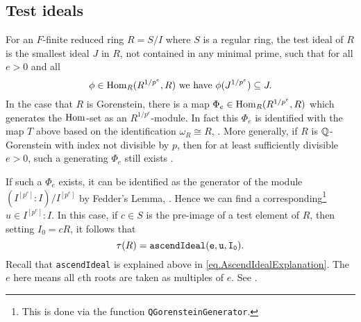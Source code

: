 \documentclass[11pt]{amsart}
\begin{document}
\subsection{Test ideals}

For an $F$-finite reduced ring $R = S/I$ where $S$ is a regular ring, the test ideal of $R$ is the smallest ideal $J$ in $R$, not contained in any minimal prime, such that for all $e > 0$ and all
\[
\phi \in \operatorname{Hom}_R(R^{1/p^e}, R) \text{ we have } \phi(J^{1/p^e}) \subseteq J.
\]
In the case that $R$ is Gorenstein, there is a map $\Phi_e \in \operatorname{Hom}_R(R^{1/p^e}, R)$ which generates the $\operatorname{Hom}$-set as an $R^{1/p^e}$-module.  In fact this $\Phi_e$ is identified with the map $T$ above based on the identification $\omega_R \cong R$, \cite{}.  More generally, if $R$ is $\mathbb{Q}$-Gorenstein with index not divisible by $p$, then for at least sufficiently divisible $e > 0$, such a generating $\Phi_e$ still exists \cite{}.

If such a $\Phi_e$ exists, it can be identified as the generator of the module $(I^{[p^e]} : I) / I^{[p^e]}$ by Fedder's Lemma, \cite{}.  Hence we can find a corresponding\footnote{This is done via the function {\tt QGorensteinGenerator}. } $u \in I^{[p^e]} : I$.  In this case, if $c \in S$ is the pre-image of a test element of $R$, then setting $I_0 = cR$, it follows that
\[
\tau(R) = {\tt ascendIdeal(e, u, I_0)}.
\]
Recall that {\tt ascendIdeal} is explained above in \autoref{eq.AscendIdealExplanation}.  The $e$ here means all $e$th roots are taken as multiples of $e$.  See \cite{}.
\end{document}
